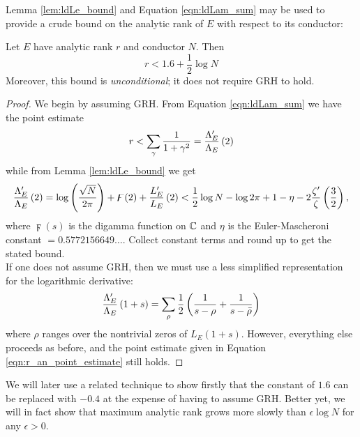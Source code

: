 Lemma \ref{lem:ldLe_bound} and Equation \ref{eqn:ldLam_sum} may be used to provide a crude bound on the analytic rank of $E$ with respect to its conductor:
\begin{corollary}\label{cor:logderiv_rank_bound}
Let $E$ have analytic rank $r$ and conductor $N$. Then
\begin{equation}
r < 1.6 + \frac{1}{2} \log N
\end{equation}
Moreover, this bound is {\it unconditional}; it does not require GRH to hold.
\end{corollary}
\begin{proof}
We begin by assuming GRH. From Equation \ref{eqn:ldLam_sum} we have the point estimate
\begin{equation}\label{eqn:r_an_point_estimate}
r < \sum_{\gamma} \frac{1}{1+\gamma^2} = \frac{\Lambda_E^{\prime}}{\Lambda_E}\left(2\right)
\end{equation}
while from Lemma \ref{lem:ldLe_bound} we get
\begin{equation}
\frac{\Lambda_E^{\prime}}{\Lambda_E}\left(2\right) =  \log\left(\frac{\sqrt{N}}{2\pi}\right) + \digamma(2) + \frac{L_E^{\prime}}{L_E}\left(2\right) < \frac{1}{2}\log N  - \log 2\pi + 1-\eta -2\frac{\zeta^{\prime}}{\zeta}\left(\frac{3}{2}\right),
\end{equation}
where $\digamma(s)$ is the digamma function on $\mathbb{C}$ and $\eta$ is the Euler-Mascheroni constant $= 0.5772156649\ldots$. Collect constant terms and round up to get the stated bound. \\

If one does not assume GRH, then we must use a less simplified representation for the logarithmic derivative:
\begin{equation}
\frac{\Lambda_E^{\prime}}{\Lambda_E}\left(1+s\right) = \sum_{\rho} \frac{1}{2}\left( \frac{1}{s-\rho} + \frac{1}{s-\bar{\rho}}\right)
\end{equation}
where $\rho$ ranges over the nontrivial zeros of $L_E(1+s)$. However, everything else proceeds as before, and the point estimate given in Equation \ref{eqn:r_an_point_estimate} still holds.
\end{proof}
We will later use a related technique to show firstly that the constant of $1.6$ can be replaced with $-0.4$ at the expense of having to assume GRH. Better yet, we will in fact show that maximum analytic rank grows more slowly than $\epsilon \log N$ for any $\epsilon>0$. \\


